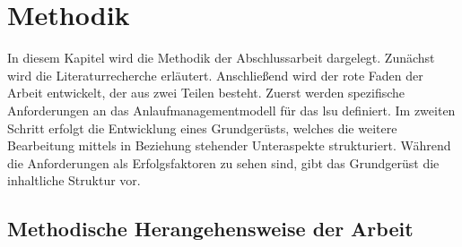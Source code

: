 \chapter{Methodik}\label{sec:methodik}
In diesem Kapitel wird die Methodik der Abschlussarbeit dargelegt. Zunächst wird die Literaturrecherche erläutert. Anschließend wird der rote Faden der Arbeit entwickelt, der aus zwei Teilen besteht. Zuerst werden spezifische Anforderungen an das Anlaufmanagementmodell für das \gls{lsu} definiert. Im zweiten Schritt erfolgt die Entwicklung eines Grundgerüsts, welches die weitere Bearbeitung mittels in Beziehung stehender Unteraspekte strukturiert. Während die Anforderungen als Erfolgsfaktoren zu sehen sind, gibt das Grundgerüst die inhaltliche Struktur vor.  


\section{Methodische Herangehensweise der Arbeit}

